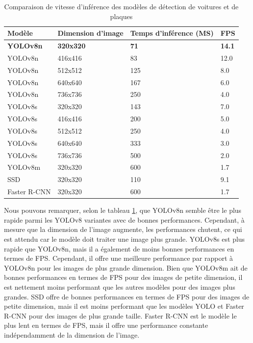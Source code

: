 \begin{table}[H]
    \centering
    \begin{tabular}{|l|l|l|l|}
    \hline
        Modèle & Dimension d'image & Temps d'inférence (MS)& FPS\\ \hline
        \textbf{YOLOv8n} & \textbf{320x320} & \textbf{71} & \textbf{14.1} \\ \hline
        YOLOv8n & 416x416 & 83 & 12.0 \\ \hline
        YOLOv8n & 512x512 & 125 & 8.0 \\ \hline
        YOLOv8n & 640x640 & 167 & 6.0 \\ \hline
        YOLOv8n & 736x736 & 250 & 4.0 \\ \hline
        YOLOv8s & 320x320 & 143 & 7.0 \\ \hline
        YOLOv8s & 416x416 & 200 & 5.0 \\ \hline
        YOLOv8s & 512x512 & 250 & 4.0 \\ \hline
        YOLOv8s & 640x640 & 333 & 3.0 \\ \hline
        YOLOv8s & 736x736 & 500 & 2.0 \\ \hline
        YOLOv8m & 320x320 & 600 & 1.7 \\ \hline
        SSD & 320x320 & 110 & 9.1 \\ \hline
        Faster R-CNN & 320x320 & 600 & 1.7 \\ \hline
    \end{tabular}
    \caption{Comparaison de vitesse d'inférence des modèles de détection de voitures et de plaques }
    \label{table:ch4-test_speed_car_allmodels}
\end{table}

Nous pouvons remarquer, selon le tableau \ref {table:ch4-test_speed_car_allmodels}, que YOLOv8n  semble être le plus rapide parmi les YOLOv8 variantes avec de bonnes performances. Cependant, à mesure que la dimension de l'image augmente, les performances chutent, ce qui est attendu car le modèle doit traiter une image plus grande. YOLOv8s  est plus rapide que YOLOv8n, mais il a également de moins bonnes performances en termes de FPS. Cependant, il offre une meilleure performance par rapport à YOLOv8n pour les images de plus grande dimension. Bien que YOLOv8m ait de bonnes performances en termes de FPS pour des images de petite dimension, il est nettement moins performant que les autres modèles pour des images plus grandes. SSD offre de bonnes performances en termes de FPS pour des images de petite dimension, mais il est moins performant que les modèles YOLO et Faster R-CNN pour des images de plus grande taille. Faster R-CNN est le modèle le plus lent en termes de FPS, mais il offre une performance constante indépendamment de la dimension de l'image.

